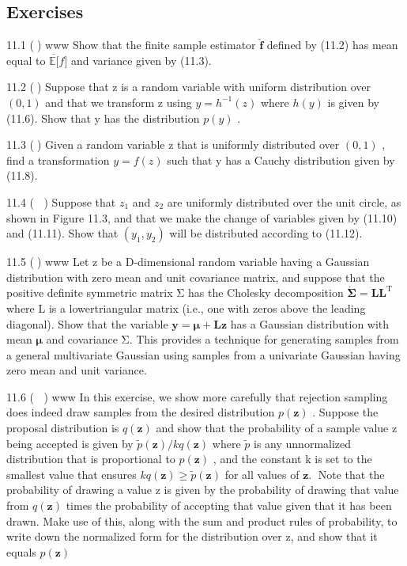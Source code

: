 \documentclass[
  10
]{article}
\begin{document}
\subsection{Exercises}\label{exercises}

11.1 () www Show that the finite sample estimator
\(\widehat { \boldsymbol { f } }\) defined by (11.2) has mean equal to
\(\overline { { \mathbb { E } [ } } f ]\) and variance given by (11.3).

11.2 () Suppose that z is a random variable with uniform distribution
over \(( 0 , 1 )\) and that we transform z using
\(y = h ^ { - 1 } ( z )\) where \(h ( y )\) is given by (11.6). Show
that y has the distribution \(p ( y )\) .

11.3 () Given a random variable z that is uniformly distributed over
\(( 0 , 1 )\) , find a transformation \(y = f ( z )\) such that y has a
Cauchy distribution given by (11.8).

11.4 ( ) Suppose that \(z _ { 1 }\) and \(z _ { 2 }\) are uniformly
distributed over the unit circle, as shown in Figure 11.3, and that we
make the change of variables given by (11.10) and (11.11). Show that
\(( y _ { 1 } , y _ { 2 } )\) will be distributed according to (11.12).

11.5 () www Let z be a D-dimensional random variable having a Gaussian
distribution with zero mean and unit covariance matrix, and suppose that
the positive definite symmetric matrix Σ has the Cholesky decomposition
\(\dot { \boldsymbol { \Sigma } } = \mathbf { L } \mathbf { L } ^ { \mathrm { T } }\)
where L is a lowertriangular matrix (i.e., one with zeros above the
leading diagonal). Show that the variable
\(\mathbf { y } = \pmb { \mu } + \mathbf { L z }\) has a Gaussian
distribution with mean \(\pmb { \mu }\) and covariance Σ. This provides
a technique for generating samples from a general multivariate Gaussian
using samples from a univariate Gaussian having zero mean and unit
variance.

11.6 ( ) www In this exercise, we show more carefully that rejection
sampling does indeed draw samples from the desired distribution
\(p ( \mathbf { z } )\) . Suppose the proposal distribution is
\(q ( \mathbf { z } )\) and show that the probability of a sample value
z being accepted is given by
\(\widetilde { p } ( \mathbf { z } ) / k q ( \mathbf { z } )\) where
\(\widetilde { p }\) is any unnormalized distribution that is
proportional to \(p ( \mathbf { z } )\) , and the constant k is set to
the smallest value that ensures
\(k q ( \mathbf { z } ) \geqslant \widetilde { p } ( \mathbf { z } )\)
for all values of \(\mathbf { z } .\)  Note that the probability of
drawing a value z is given by the probability of drawing that value from
\(q ( \mathbf { z } )\) times the probability of accepting that value
given that it has been drawn. Make use of this, along with the sum and
product rules of probability, to write down the normalized form for the
distribution over z, and show that it equals \(p ( \mathbf { z } )\)
\end{document}
